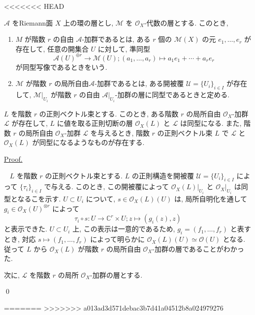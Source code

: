 \documentclass[a4paper,10pt,dvipdfmx]{jsreport}
\newenvironment{theorem*}{\refstepcounter{theorem}\begin{itembox}[l]{\underline{Theorem \arabic{chapter}.\arabic{section}.\arabic{theorem}.}}\vspace{-0.5zh}\ }{\end{itembox}}
\newenvironment{defi*}{\refstepcounter{theorem}\begin{itembox}[l]{\underline{Definition \arabic{chapter}.\arabic{section}.\arabic{theorem}.}}\vspace{-0.5zh}\ }{\end{itembox}}
\renewenvironment{proof}{\begin{flushleft} \underline{Proof.} \end{flushleft}\vspace{-1zh}\ }{\qed\\}
\newcounter{theorem}[section]
\theoremstyle{definition}
\begin{document}
<<<<<<< HEAD
\begin{defi*}
    \(\mathcal{A}\) をRiemann面 \(X\) 上の環の層とし, \(\mathcal{M}\) を \(\mathcal{O}_X\)-代数の層とする. このとき,
    \begin{enumerate}
        \item \(M\) が階数 \(r\) の自由 \(\mathcal{A}\)-加群であるとは, ある \(r\) 個の \(\mathcal{M}(X)\) の元 \(e_1,\ldots ,e_r\) が存在して, 任意の開集合 \(U\) に対して, 準同型
        \[
            \mathcal{A}(U)^{\oplus r} \to \mathcal{M}(U);(a_1,\ldots,a_r) \mapsto a_1 e_1 +\cdots +a_r e_r
        \]
        が同型写像であるときをいう.

        \item \(\mathcal{M}\) が階数 \(r\) の局所自由\(\mathcal{A}\)-加群であるとは, ある開被覆 \(\mathcal{U}=\{U_i\}_{i \in I}\) が存在して, \(\mathcal{M}|_{U_i}\) が階数 \(r\) の自由 \(\mathcal{A}|_{U_i}\)-加群の層に同型であるときと定める.
    \end{enumerate}
\end{defi*}

\begin{theorem*}
    \(L\) を階数 \(r\) の正則ベクトル束とする. このとき, ある階数 \(r\) の局所自由 \(\mathcal{O}_X\)-加群 \(\mathcal{L}\) が存在して, \(L\) に値を取る正則切断の層 \(\mathcal{O}_X(L)\) と \(\mathcal{L}\) は同型になる. また, 階数 \(r\) の局所自由 \(\mathcal{O}_X\)-加群 \(\mathcal{L}\) を与えるとき, 階数 \(r\) の正則ベクトル束 \(L\) で \(\mathcal{L}\) と \(\mathcal{O}_X(L)\) が同型になるようなものが存在する.
\end{theorem*}
\begin{proof}
    \(L\) を階数 \(r\) の正則ベクトル束とする. \(L\) の正則構造を開被覆 \(\mathcal{U} = \{U_i\}_{i\in I}\) によって \(\{\tau_i\}_{i\in I}\) で与える. このとき, この開被覆によって \(\mathcal{O}_X(L)|_{U_i}\) と \(\mathcal{O}_X|_{U_i}\) は同型となるこを示す. \(U\subset U_i\) について, \(s\in \mathcal{O}_X(L)(U)\) は, 局所自明化を通して \(g_i \in \mathcal{O}_X(U)^{\otimes r}\) によって
    \[
        \tau_i \circ s \colon U \to  \mathbb{C}^r \times U;z\mapsto (g_i(z),z)
    \]
    と表示できた. \(U\subset U_i\) 上, この表示は一意的であるため, \(g_i  = (f_1,\ldots,f_r)\) と表すとき, 対応 \(s \mapsto (f_1,\ldots,f_r)\) によって明らかに \(\mathcal{O}_X(L)(U) \simeq \mathcal{O}(U)\) となる. 従って \(L\) から \(\mathcal{O}_X(L)\) が階数 \(r\) の局所自由 \(\mathcal{O}_X\)-加群の層であることがわかった.

    次に, \(\mathcal{L}\) を階数 \(r\) の局所 \(\mathcal{O}_X\)-加群の層とする.

\end{proof}

=======
>>>>>>> a013ad3d571debac3b7d41a04512b8a024979276
\end{document}
